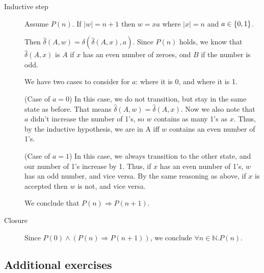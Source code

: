 \documentclass{article}
\begin{document}
\begin{enumerate}
\begin{description}
            \item[Inductive step]
                Assume $P(n)$. If $|w| = n + 1$ then $w = xa$ where $|x| = n$ and $a \in \set{0,1}$.

                Then $\hat{\delta}(A, w) = \delta(\hat{\delta}(A, x), a)$. Since $P(n)$ holds, we know that $\hat{\delta}(A,x)$ is $A$ if $x$ has an even number of zeroes, ond $B$ if the number is odd.

                We have two cases to consider for $a$: where it is 0, and where it is 1.

                (Case of $a=0$) In this case, we do not transition, but stay in the same state as before. That means $\hat{\delta}(A, w) = \hat{\delta}(A,x)$. Now we also note that $a$ didn't increase the number of 1's, so $w$ contains as many 1's as $x$. Thus, by the inductive hypothesis, we are in A iff $w$ contains an even number of 1's.

                (Case of $a=1$) In this case, we always transition to the other state, and our number of 1's increase by 1. Thus, if $x$ has an even number of 1's, $w$ has an odd number, and vice versa. By the same reasoning as above, if $x$ is accepted then $w$ is not, and vice versa.

                We conclude that $P(n) \Rightarrow P(n+1)$.
                
            \item[Closure]
                Since $P(0) \land (P(n) \Rightarrow P(n+1))$, we conclude $\forall n \in \mathbb{N}. P(n)$.

        \end{description}

\end{enumerate}

\newpage
\subsection*{Additional exercises}
\end{document}
